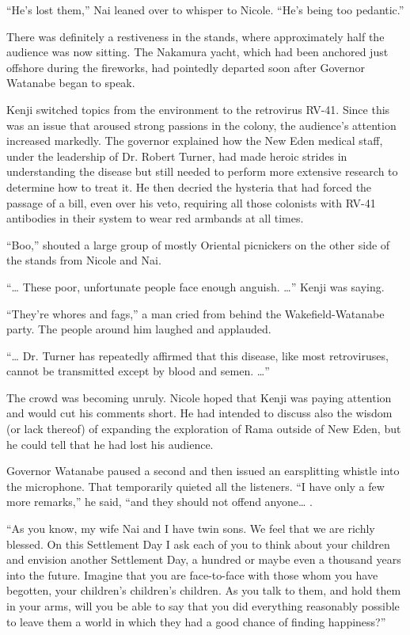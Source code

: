 \documentclass[]{article}
\begin{document}
{“He’s lost them,” Nai leaned over to whisper to Nicole. “He’s being too pedantic.”

There was definitely a restiveness in the stands, where approximately half the audience was now sitting. The Nakamura yacht, which had been anchored just offshore during the fireworks, had pointedly departed soon after Governor Watanabe began to speak.

Kenji switched topics from the environment to the retrovirus RV-41. Since this was an issue that aroused strong passions in the colony, the audience’s attention increased markedly. The governor explained how the New Eden medical staff, under the leadership of Dr. Robert Turner, had made heroic strides in understanding the disease but still needed to perform more extensive research to determine how to treat it. He then decried the hysteria that had forced the passage of a bill, even over his veto, requiring all those colonists with RV-41 antibodies in their system to wear red armbands at all times.

“Boo,” shouted a large group of mostly Oriental picnickers on the other side of the stands from Nicole and Nai.

“… These poor, unfortunate people face enough anguish. …” Kenji was saying.

“They’re whores and fags,” a man cried from behind the Wakefield-Watanabe party. The people around him laughed and applauded.

“… Dr. Turner has repeatedly affirmed that this disease, like most retroviruses, cannot be transmitted except by blood and semen. …”

The crowd was becoming unruly. Nicole hoped that Kenji was paying attention and would cut his comments short. He had intended to discuss also the wisdom (or lack thereof) of expanding the exploration of Rama outside of New Eden, but he could tell that he had lost his audience.

Governor Watanabe paused a second and then issued an earsplitting whistle into the microphone. That temporarily quieted all the listeners. “I have only a few more remarks,” he said, “and they should not offend anyone… .

“As you know, my wife Nai and I have twin sons. We feel that we are richly blessed. On this Settlement Day I ask each of you to think about your children and envision another Settlement Day, a hundred or maybe even a thousand years into the future. Imagine that you are face-to-face with those whom you have begotten, your children’s children’s children. As you talk to them, and hold them in your arms, will you be able to say that you did everything reasonably possible to leave them a world in which they had a good chance of finding happiness?”

}
\end{document}

